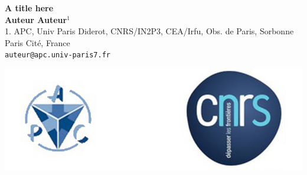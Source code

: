 \documentclass[a0,portrait]{a0poster}
\begin{document}


\begin{minipage}[b]{0.75\linewidth}
  \Huge \textbf{A title here}\\[1cm] %
  \large \textbf{Auteur Auteur$^{1}$}\\[1cm] %
  \normalsize 1. APC, Univ Paris Diderot, CNRS/IN2P3, CEA/Irfu, Obs. de Paris, Sorbonne Paris Cit\'e, France\\
  \large \texttt{auteur@apc.univ-paris7.fr}\\
\end{minipage}
%
\begin{minipage}[b]{0.25\linewidth}
\includegraphics[width=20cm]{logo.png}
\end{minipage}

\vspace{1cm} %

\end{document}
